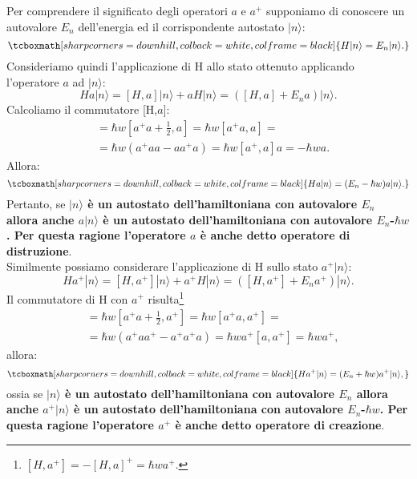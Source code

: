 Per comprendere il significato degli operatori $a$ e $a^+$ supponiamo di conoscere un autovalore $E_n$  dell'energia ed il corrispondente autostato $|n \rangle$:
	\begin{equation}
		\tcboxmath[sharp corners=downhill, colback=white, colframe=black]{		
			H|n\rangle=E_n|n\rangle.
			}
	\end{equation}
Consideriamo quindi l'applicazione di H allo stato ottenuto applicando l'operatore $a$ ad $|n\rangle$:
	\begin{equation}
		Ha|n\rangle= [H,a]|n \rangle+aH|n\rangle=([H,a]+E_na)|n\rangle.
	\end{equation}
Calcoliamo il commutatore [H,$a$]:
	\begin{align}
		[H,a]&=\hbar w[a^+a+\frac{1}{2},a]=\hbar w [a^+a,a]= \nonumber\\
		&=\hbar w (a^+aa-aa^+a)=\hbar w[a^+,a]a=-\hbar wa.
	\end{align}
Allora:
	\begin{equation}
		\tcboxmath[sharp corners=downhill, colback=white, colframe=black]{
		Ha|n\rangle=(E_n-\hbar w)a|n\rangle.
		}
	\end{equation}
Pertanto, se \textbf{$|n\rangle$ è un autostato dell'hamiltoniana con autovalore $E_n$ allora anche $a|n\rangle$ è  un autostato dell'hamiltoniana con autovalore $E_n$-$\hbar w$. Per questa ragione l'operatore $a$ è anche detto operatore di distruzione}.  \\

 Similmente possiamo considerare l'applicazione di H sullo stato $a^+|n\rangle$:
	\begin{equation}
		Ha^+|n\rangle= [H,a^+]|n\rangle+a^+H|n\rangle=([H,a^+]+E_na^+)|n\rangle.
	\end{equation}
Il commutatore di H con $a^+$ risulta\footnote{$[H,a^+]=-[H,a]^+=\hbar w a^+$.}
	\begin{align}
		[H,a^+]&= \hbar w[a^+a+\frac{1}{2},a^+]=\hbar w [a^+a,a^+]= \nonumber\\
		&= \hbar w (a^+aa^+-a^+a^+a)=\hbar w a^+ [a,a^+]=\hbar wa^+,
	\end{align}
allora:
	\begin{equation}
		\tcboxmath[sharp corners=downhill, colback=white, colframe=black]{
			Ha^+|n\rangle=(E_n+\hbar w)a^+|n\rangle,
			}
	\end{equation}
ossia se \textbf{$|n\rangle$ è un autostato dell'hamiltoniana con autovalore $E_n$ allora anche $a^+|n\rangle$ è  un autostato dell'hamiltoniana con autovalore $E_n$-$\hbar w$. Per questa ragione l'operatore $a^+$ è anche detto operatore di creazione}. \\ 

